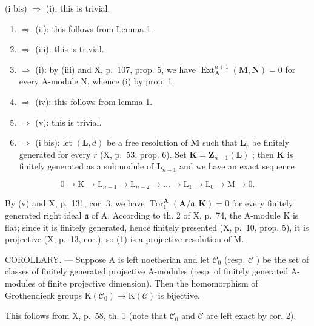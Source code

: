 (i bis) \(\Rightarrow\) (i): this is trivial.

\begin{enumerate}
\def\labelenumi{(\roman{enumi})}
\item
  \(\Rightarrow\) (ii): this follows from Lemma 1.
\item
  \(\Rightarrow\) (iii): this is trivial.
\item
  \(\Rightarrow\) (i): by (iii) and X, p.~107, prop. 5, we have \(\operatorname{Ext}_{\mathbf{A}}^{n+1}(\mathbf{M}, \mathbf{N}) = 0\) for every A-module N, whence (i) by prop. 1.
\item
  \(\Rightarrow\) (iv): this follows from lemma 1.
\item
  \(\Rightarrow\) (v): this is trivial.
\item
  \(\Rightarrow\) (i bis): let \((\mathbf{L}, d)\) be a free resolution of \(\mathbf{M}\) such that \(\mathbf{L}_r\) be finitely generated for every \(r\) (X, p.~53, prop. 6). Set \(\mathbf{K} = \mathbf{Z}_{n-1}(\mathbf{L})\) ; then \(\mathbf{K}\) is finitely generated as a submodule of \(\mathbf{L}_{n-1}\) and we have an exact sequence
\end{enumerate}

\[
0 \rightarrow \mathrm{K} \rightarrow \mathrm{L} _ {n - 1} \rightarrow \mathrm{L} _ {n - 2} \rightarrow \dots \rightarrow \mathrm{L} _ {1} \rightarrow \mathrm{L} _ {0} \rightarrow \mathrm{M} \rightarrow 0.\tag{1}
\]

By (v) and X, p.~131, cor. 3, we have \(\operatorname{Tor}_{1}^{\mathbf{A}}(\mathbf{A}/\mathfrak{a},\mathbf{K}) = 0\) for every finitely generated right ideal \(\mathfrak{a}\) of A. According to th. 2 of X, p.~74, the A-module K is flat; since it is finitely generated, hence finitely presented (X, p.~10, prop. 5), it is projective (X, p.~13, cor.), so (1) is a projective resolution of M.

COROLLARY. --- Suppose A is left noetherian and let \(\mathcal{C}_{0}\) (resp. \(\mathcal{C}\) ) be the set of classes of finitely generated projective A-modules (resp. of finitely generated A-modules of finite projective dimension). Then the homomorphism of Grothendieck groups \(\mathrm{K}(\mathcal{C}_{0}) \to \mathrm{K}(\mathcal{C})\) is bijective.

This follows from X, p.~58, th. 1 (note that \(\mathcal{C}_0\) and \(\mathcal{C}\) are left exact by cor. 2).

